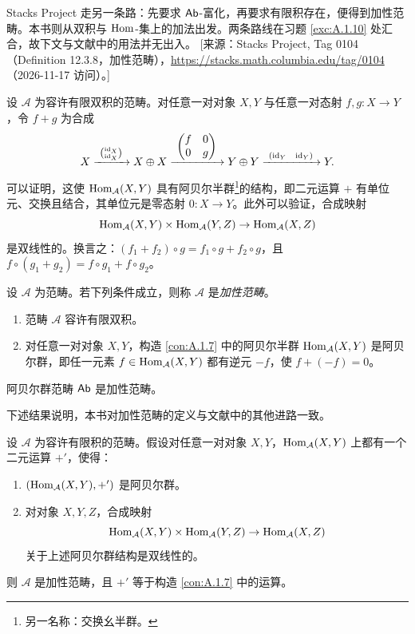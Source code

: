 \begin{yizhu}
Stacks Project 走另一条路：先要求 $\mathsf{Ab}$-富化，再要求有限积存在，便得到加性范畴。本书则从双积与 $\operatorname{Hom}$-集上的加法出发。两条路线在习题 \ref{exc:A.1.10} 处汇合，故下文与文献中的用法并无出入。
[来源：Stacks Project, Tag 0104（Definition 12.3.8，加性范畴），\url{https://stacks.math.columbia.edu/tag/0104}（2026-11-17 访问）。]
\end{yizhu}

\begin{construction}\label{con:A.1.7}
设 $\mathcal{A}$ 为容许有限双积的范畴。对任意一对对象 $X,Y$ 与任意一对态射 $f,g:X\to Y$，令 $f+g$ 为合成
\[
X\xrightarrow{\ \binom{\id_X}{\id_X}\ }X\oplus X
\xrightarrow{\ \begin{pmatrix}f & 0\\ 0 & g\end{pmatrix}\ }Y\oplus Y
\xrightarrow{\ (\id_Y\ \ \id_Y)\ }Y.
\]
可以证明，这使 $\operatorname{Hom}_{\mathcal{A}}(X,Y)$ 具有阿贝尔半群\footnote{另一名称：交换幺半群。}的结构，即二元运算 $+$ 有单位元、交换且结合，其单位元是零态射 $0:X\to Y$。此外可以验证，合成映射
\[
\operatorname{Hom}_{\mathcal{A}}(X,Y)\times\operatorname{Hom}_{\mathcal{A}}(Y,Z)\to\operatorname{Hom}_{\mathcal{A}}(X,Z)
\]
是双线性的。换言之：$(f_1+f_2)\circ g=f_1\circ g+f_2\circ g$，且 $f\circ(g_1+g_2)=f\circ g_1+f\circ g_2$。
\end{construction}

\begin{definition}\label{def:A.1.8}
设 $\mathcal{A}$ 为范畴。若下列条件成立，则称 $\mathcal{A}$ 是\emph{加性范畴}。
\begin{enumerate}[label=(\roman*),leftmargin=2em,itemsep=0.25ex]
  \item 范畴 $\mathcal{A}$ 容许有限双积。
  \item 对任意一对对象 $X,Y$，构造 \ref{con:A.1.7} 中的阿贝尔半群 $\operatorname{Hom}_{\mathcal{A}}(X,Y)$ 是阿贝尔群，即任一元素 $f\in\operatorname{Hom}_{\mathcal{A}}(X,Y)$ 都有逆元 $-f$，使 $f+(-f)=0$。
\end{enumerate}
\end{definition}

\begin{example}\label{ex:A.1.9}
阿贝尔群范畴 $\mathsf{Ab}$ 是加性范畴。
\end{example}

下述结果说明，本书对加性范畴的定义与文献中的其他进路一致。

\begin{exercise}\label{exc:A.1.10}
设 $\mathcal{A}$ 为容许有限积的范畴。假设对任意一对对象 $X,Y$，$\operatorname{Hom}_{\mathcal{A}}(X,Y)$ 上都有一个二元运算 $+'$，使得：
\begin{enumerate}[label=(\roman*),leftmargin=2em,itemsep=0.25ex]
  \item $(\operatorname{Hom}_{\mathcal{A}}(X,Y),+')$ 是阿贝尔群。
  \item 对对象 $X,Y,Z$，合成映射
  \[
  \operatorname{Hom}_{\mathcal{A}}(X,Y)\times\operatorname{Hom}_{\mathcal{A}}(Y,Z)\to\operatorname{Hom}_{\mathcal{A}}(X,Z)
  \]
  关于上述阿贝尔群结构是双线性的。
\end{enumerate}
则 $\mathcal{A}$ 是加性范畴，且 $+'$ 等于构造 \ref{con:A.1.7} 中的运算。
\end{exercise}

